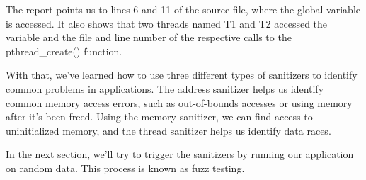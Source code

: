 The report points us to lines 6 and 11 of the source file, where the global variable is accessed. It also shows that two threads named T1 and T2 accessed the variable and the file and line number of the respective calls to the pthread\_create() function.

With that, we’ve learned how to use three different types of sanitizers to identify common problems in applications. The address sanitizer helps us identify common memory access errors, such as out-of-bounds accesses or using memory after it’s been freed. Using the memory sanitizer, we can find access to uninitialized memory, and the thread sanitizer helps us identify data races.

In the next section, we’ll try to trigger the sanitizers by running our application on random data. This process is known as fuzz testing.



